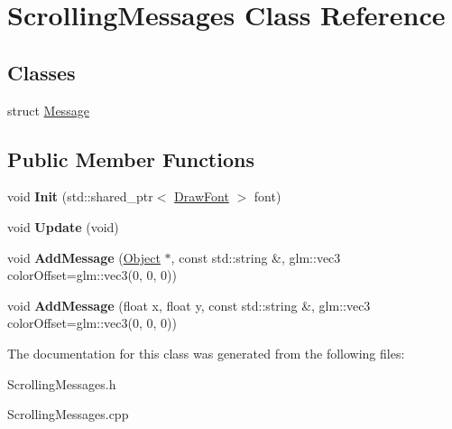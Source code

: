 \hypertarget{classScrollingMessages}{\section{\-Scrolling\-Messages \-Class \-Reference}
\label{classScrollingMessages}
}
\subsection*{\-Classes}
\begin{DoxyCompactItemize}
\item 
struct \hyperlink{structScrollingMessages_1_1Message}{\-Message}
\end{DoxyCompactItemize}
\subsection*{\-Public \-Member \-Functions}
\begin{DoxyCompactItemize}
\item 
\hypertarget{classScrollingMessages_af91408cb77a56f0b8da094c2e4a6c096}{void {\bfseries \-Init} (std\-::shared\-\_\-ptr$<$ \hyperlink{classDrawFont}{\-Draw\-Font} $>$ font)}\label{classScrollingMessages_af91408cb77a56f0b8da094c2e4a6c096}

\item 
\hypertarget{classScrollingMessages_a49e1264c600b95c11bb953af4bafe356}{void {\bfseries \-Update} (void)}\label{classScrollingMessages_a49e1264c600b95c11bb953af4bafe356}

\item 
\hypertarget{classScrollingMessages_aaa091da095156db96381ce1c4e69efc8}{void {\bfseries \-Add\-Message} (\hyperlink{classObject}{\-Object} $\ast$, const std\-::string \&, glm\-::vec3 color\-Offset=glm\-::vec3(0, 0, 0))}\label{classScrollingMessages_aaa091da095156db96381ce1c4e69efc8}

\item 
\hypertarget{classScrollingMessages_aac61a5d47bb7fdfd93852bae5432239f}{void {\bfseries \-Add\-Message} (float x, float y, const std\-::string \&, glm\-::vec3 color\-Offset=glm\-::vec3(0, 0, 0))}\label{classScrollingMessages_aac61a5d47bb7fdfd93852bae5432239f}

\end{DoxyCompactItemize}


\-The documentation for this class was generated from the following files\-:\begin{DoxyCompactItemize}
\item 
\-Scrolling\-Messages.\-h\item 
\-Scrolling\-Messages.\-cpp\end{DoxyCompactItemize}
